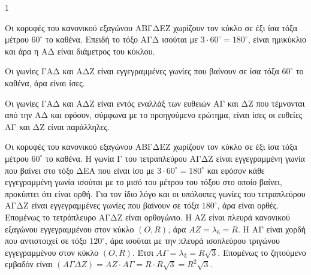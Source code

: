 \begin{ylh}{1}
    \item [Κανόνικά πολύγωνα, Εμβαδά]
\end{ylh}

\begin{alist}
    \item 
    \begin{figure}
        \centering
    \end{figure}
    \begin{rlist}
        \item Οι κορυφές του κανονικού εξαγώνου ΑΒΓΔΕΖ χωρίζουν τον κύκλο σε έξι ίσα τόξα μέτρου $60^\circ$ το καθένα. Επειδή το τόξο ΑΓΔ ισούται με $3 \cdot 60^\circ=180^\circ$, είναι ημικύκλιο και άρα η ΑΔ είναι διάμετρος του κύκλου.
        \item Οι γωνίες ΓΑΔ και ΑΔΖ είναι εγγεγραμμένες γωνίες που βαίνουν σε ίσα τόξα $60^\circ$ το καθένα, άρα είναι ίσες.
        \item Οι γωνίες ΓΑΔ και ΑΔΖ είναι εντός εναλλάξ των ευθειών ΑΓ και ΔΖ που τέμνονται από την ΑΔ και εφόσον, σύμφωνα με το προηγούμενο ερώτημα, είναι ίσες οι ευθείες ΑΓ και ΔΖ είναι παράλληλες.
        \item Οι κορυφές του κανονικού εξαγώνου ΑΒΓΔΕΖ χωρίζουν τον κύκλο σε έξι ίσα τόξα μέτρου $60^\circ$ το καθένα. Η γωνία Γ του τετραπλεύρου ΑΓΔΖ είναι εγγεγραμμένη γωνία που βαίνει στο τόξο ΔΕΑ που είναι ίσο με $3 \cdot 60^\circ=180^\circ$ και εφόσον κάθε εγγεγραμμένη γωνία ισούται με το μισό του μέτρου του τόξου στο οποίο βαίνει, προκύπτει ότι είναι ορθή. Για τον ίδιο λόγο και οι υπόλοιπες γωνίες του τετραπλεύρου ΑΓΔΖ είναι εγγεγραμμένες γωνίες που βαίνουν σε τόξα $180^\circ$, άρα είναι ορθές. Επομένως το τετράπλευρο ΑΓΔΖ είναι ορθογώνιο. Η ΑΖ είναι πλευρά κανονικού εξαγώνου εγγεγραμμένου στον κύκλο $(O, R)$, άρα $ΑΖ=\lambda_6=R$. Η ΑΓ είναι χορδή που αντιστοιχεί σε τόξο $120^\circ$, άρα ισούται με την πλευρά ισοπλεύρου τριγώνου εγγεγραμμένου στον κύκλο $(O,R)$. Έτσι $ΑΓ=\lambda_3=R\sqrt{3}$. Επομένως το ζητούμενο εμβαδόν είναι $(ΑΓΔΖ)=ΑΖ \cdot ΑΓ=R \cdot R\sqrt{3}=R^2\sqrt{3}$.
    \end{rlist}


\end{alist}

